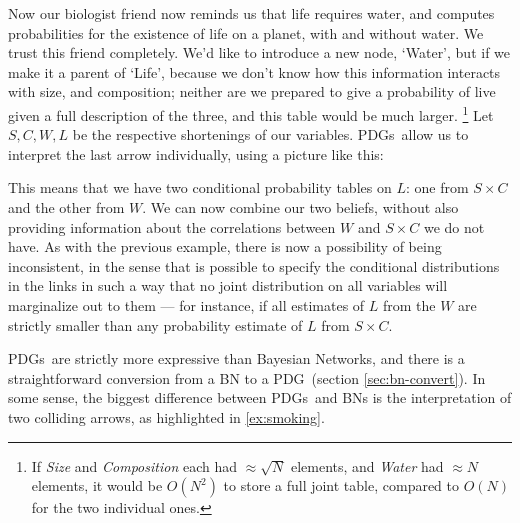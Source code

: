 \documentclass{article}
\newcommand\changed[1]{{\color{note-fg} #1}}
\newcommand{\MN}{PDG}
\newcommand{\MNs}{\MN s}
\begin{document}
\begin{example}
		Now our biologist friend now reminds us that life requires water, and computes probabilities for the existence of life on a planet, with and without water. We trust this friend completely. \changed{We'd like to introduce a new node, `Water', but if we make it a parent of `Life', because we don't know how this information interacts with size, and composition; neither are we prepared to give a probability of live given a full description of the three, and this table would be much larger}.%
			\footnote{If \textit{Size} and \textit{Composition} each had $\approx\sqrt{N}$ elements, and \textit{Water} had $\approx N$ elements, it would be $O(N^2)$ to store a full joint table, compared to $O(N)$ for the two individual ones.} %
		Let $S, C, W, L$ be the respective shortenings of our variables.
		\MNs\ allow us to interpret the last arrow individually, using a picture like this:

		\begin{center}
		\end{center}
	
		This means that we have two conditional probability tables on $L$: one from $S \times C$ and the other from $W$. We can now combine our two beliefs, without also \changed{providing} information about the correlations between $W$ and $S\times C$ we do not have. As with the previous example, there is now a possibility of being inconsistent, in the sense that is possible to specify the conditional distributions in the links in such a way that no joint distribution on all variables will marginalize out to them --- for instance, if all estimates of $L$ from the $W$ are strictly smaller than any probability estimate of $L$ from $S \times C$.
	\end{example}
	
	\MNs\ are strictly more expressive than Bayesian Networks, and there is a straightforward conversion from a BN to a \MN\ (section \ref{sec:bn-convert}). 
	\changed{In some sense}, the biggest difference between \MNs\ and BNs is the interpretation of two colliding arrows, as highlighted in \cref{ex:smoking}.
	
\end{document}
